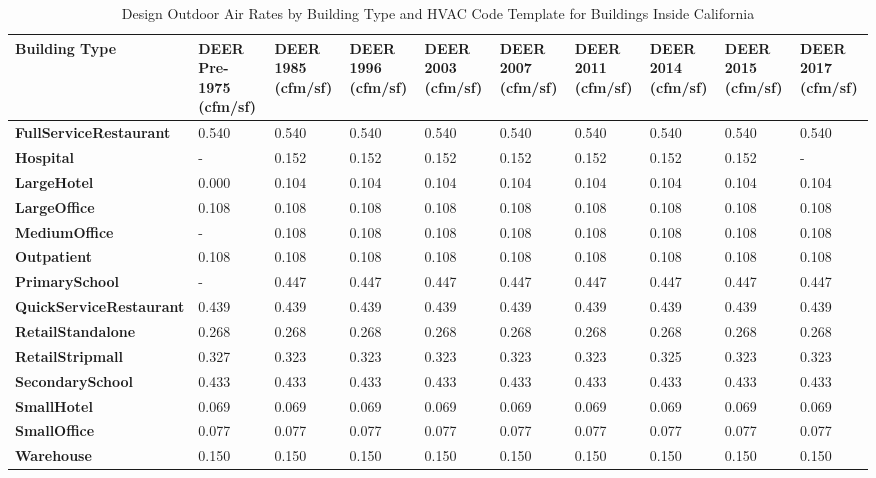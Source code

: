 \begin{table}
\small
\centering
\caption[Design Outdoor Air Rates---Inside California]{Design Outdoor Air Rates by Building Type and HVAC Code Template for Buildings Inside California}
\label{tab:outdoor_air_table_deer}
\begin{tabular}{|p{1in}|p{0.4in}|p{0.4in}|p{0.4in}|p{0.4in}|p{0.4in}|p{0.4in}|p{0.4in}|p{0.4in}|p{0.4in}|}
\hline
\textbf{Building   Type} &
  \textbf{DEER Pre-1975 (cfm/sf)} &
  \textbf{DEER 1985 (cfm/sf)} &
  \textbf{DEER 1996 (cfm/sf)} &
  \textbf{DEER 2003 (cfm/sf)} &
  \textbf{DEER 2007 (cfm/sf)} &
  \textbf{DEER 2011 (cfm/sf)} &
  \textbf{DEER 2014 (cfm/sf)} &
  \textbf{DEER 2015 (cfm/sf)} &
  \textbf{DEER 2017 (cfm/sf)} \\ \hline
\textbf{FullService\-Restaurant}  & 0.540 & 0.540 & 0.540 & 0.540 & 0.540 & 0.540 & 0.540 & 0.540 & 0.540 \\ \hline
\textbf{Hospital}                 & -     & 0.152 & 0.152 & 0.152 & 0.152 & 0.152 & 0.152 & 0.152 & -     \\ \hline
\textbf{LargeHotel}               & 0.000 & 0.104 & 0.104 & 0.104 & 0.104 & 0.104 & 0.104 & 0.104 & 0.104 \\ \hline
\textbf{LargeOffice}              & 0.108 & 0.108 & 0.108 & 0.108 & 0.108 & 0.108 & 0.108 & 0.108 & 0.108 \\ \hline
\textbf{MediumOffice}             & -     & 0.108 & 0.108 & 0.108 & 0.108 & 0.108 & 0.108 & 0.108 & 0.108 \\ \hline
\textbf{Outpatient}               & 0.108 & 0.108 & 0.108 & 0.108 & 0.108 & 0.108 & 0.108 & 0.108 & 0.108 \\ \hline
\textbf{PrimarySchool}            & -     & 0.447 & 0.447 & 0.447 & 0.447 & 0.447 & 0.447 & 0.447 & 0.447 \\ \hline
\textbf{QuickService\-Restaurant} & 0.439 & 0.439 & 0.439 & 0.439 & 0.439 & 0.439 & 0.439 & 0.439 & 0.439 \\ \hline
\textbf{RetailStandalone}         & 0.268 & 0.268 & 0.268 & 0.268 & 0.268 & 0.268 & 0.268 & 0.268 & 0.268 \\ \hline
\textbf{RetailStripmall}          & 0.327 & 0.323 & 0.323 & 0.323 & 0.323 & 0.323 & 0.325 & 0.323 & 0.323 \\ \hline
\textbf{SecondarySchool}          & 0.433 & 0.433 & 0.433 & 0.433 & 0.433 & 0.433 & 0.433 & 0.433 & 0.433 \\ \hline
\textbf{SmallHotel}               & 0.069 & 0.069 & 0.069 & 0.069 & 0.069 & 0.069 & 0.069 & 0.069 & 0.069 \\ \hline
\textbf{SmallOffice}              & 0.077 & 0.077 & 0.077 & 0.077 & 0.077 & 0.077 & 0.077 & 0.077 & 0.077 \\ \hline
\textbf{Warehouse}                & 0.150 & 0.150 & 0.150 & 0.150 & 0.150 & 0.150 & 0.150 & 0.150 & 0.150 \\ \hline
\end{tabular}
\end{table}